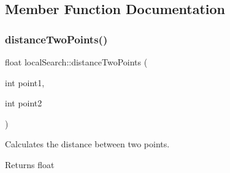 \subsection{Member Function Documentation}
\mbox{\label{classlocalSearch_a5e85839cfb397c2ee38fa38bfbbc4151}} 
\subsubsection{\texorpdfstring{distance\+Two\+Points()}{distanceTwoPoints()}}
{\footnotesize\ttfamily float local\+Search\+::distance\+Two\+Points (\begin{DoxyParamCaption}\item[{int}]{point1,  }\item[{int}]{point2 }\end{DoxyParamCaption})}



Calculates the distance between two points. 

\begin{DoxyReturn}{Returns}
float 
\end{DoxyReturn}

